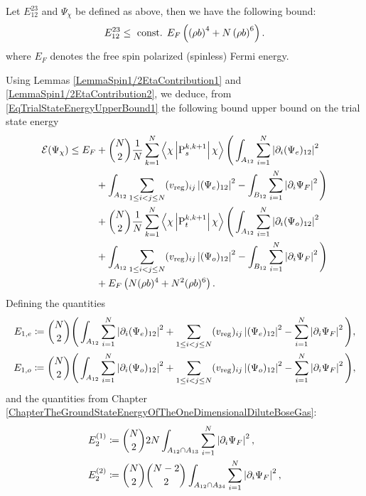\begin{lemma}\label{LemmaSpin1/2EtaContribution2}
	Let $ E_{12}^{23} $ and $ \Psi_{\chi} $ be defined as above, then we have the following bound:\begin{equation}
	E_{12}^{23}\leq \textnormal{ const. } E_F\left(\left(\rho b\right)^4+N\left(\rho b\right)^6 \right).
	\end{equation}
	where $ E_F $ denotes the free spin polarized (spinless) Fermi energy.
\end{lemma}
Using Lemmas \ref{LemmaSpin1/2EtaContribution1} and \ref{LemmaSpin1/2EtaContribution2}, we deduce, from \eqref{EqTrialStateEnergyUpperBound1} the following bound upper bound on the trial state energy
\begin{equation}
\begin{aligned}
\mathcal{E}(\Psi_{\chi})\leq E_F&+\binom{N}{2}\frac{1}{N}\sum_{k=1}^{N}\left\langle\chi \left\lvert \operatorname{P}^{k,k+1}_s  \right\rvert \chi\right\rangle\Bigg(\int_{A_{12}}\sum_{i=1}^{N}\left\lvert \partial_i(\Psi_e)_{12} \right\rvert^2\\
&+\int_{A_{12}}\sum_{1\leq i<j\leq N}(v_{\text{reg}})_{ij}\left\lvert (\Psi_e)_{12} \right\rvert^2-\int_{B_{12}}\sum_{i=1}^{N}\left\lvert \partial_i \Psi_F \right\rvert^2\Bigg)\\
&+\binom{N}{2}\frac{1}{N}\sum_{k=1}^{N}\left\langle\chi \left\lvert \operatorname{P}^{k,k+1}_t  \right\rvert \chi\right\rangle\Bigg(\int_{A_{12}}\sum_{i=1}^{N}\left\lvert \partial_i(\Psi_o)_{12} \right\rvert^2\\
&+\int_{A_{12}}\sum_{1\leq i<j\leq N}(v_{\text{reg}})_{ij}\left\lvert (\Psi_o)_{12} \right\rvert^2-\int_{B_{12}}\sum_{i=1}^{N}\left\lvert \partial_i \Psi_F \right\rvert^2\Bigg)\\
&+E_F\left(N(\rho b)^4+ N^2 (\rho b)^6\right).
\end{aligned}
\end{equation}
Defining the quantities \begin{equation}
\begin{aligned}
E_{1,e}\coloneqq\binom{N}{2}\Bigg(\int_{A_{12}}\sum_{i=1}^{N}\left\lvert \partial_i(\Psi_e)_{12} \right\rvert^2
&+\sum_{1\leq i<j\leq N}(v_{\text{reg}})_{ij}\left\lvert (\Psi_e)_{12} \right\rvert^2-\sum_{i=1}^{N}\left\lvert \partial_i \Psi_F \right\rvert^2\Bigg),\\
E_{1,o}\coloneqq\binom{N}{2}\Bigg(\int_{A_{12}}\sum_{i=1}^{N}\left\lvert \partial_i(\Psi_o)_{12} \right\rvert^2
&+\sum_{1\leq i<j\leq N}(v_{\text{reg}})_{ij}\left\lvert (\Psi_o)_{12} \right\rvert^2-\sum_{i=1}^{N}\left\lvert \partial_i \Psi_F \right\rvert^2\Bigg),
\end{aligned}
\end{equation}
and the quantities from Chapter \ref{ChapterTheGroundStateEnergyOfTheOneDimensionalDiluteBoseGas}:\begin{equation}
\begin{aligned}
E_2^{(1)}&\coloneqq\binom{N}{2}2N\int_{A_{12}\cap A_{13}}\sum_{i=1}^{N}\left\lvert \partial_i\Psi_F \right\rvert^2,\\ E_2^{(2)}&\coloneqq\binom{N}{2}\binom{N-2}{2}\int_{A_{12}\cap A_{34}}\sum_{i=1}^{N}\left\lvert \partial_i\Psi_F \right\rvert^2,
\end{aligned}
\end{equation}
